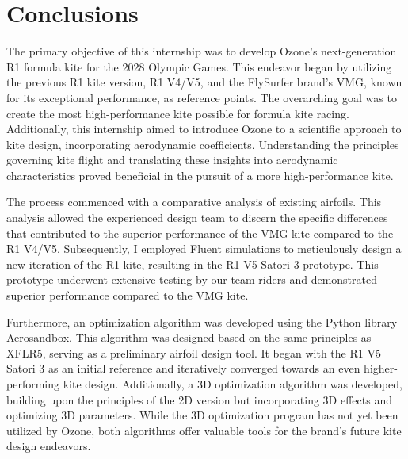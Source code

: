 
\chapter{Conclusions} 	%
\label{Conclusion} 		%



The primary objective of this internship was to develop Ozone's next-generation R1 formula kite for the 2028 Olympic Games. This endeavor began by utilizing the previous R1 kite version, R1 V4/V5, and the FlySurfer brand's VMG, known for its exceptional performance, as reference points. The overarching goal was to create the most high-performance kite possible for formula kite racing. 
Additionally, this internship aimed to introduce Ozone to a scientific approach to kite design, incorporating aerodynamic coefficients. Understanding the principles governing kite flight and translating these insights into aerodynamic characteristics proved beneficial in the pursuit of a more high-performance kite.

The process commenced with a comparative analysis of existing airfoils. This analysis allowed the experienced design team to discern the specific differences that contributed to the superior performance of the VMG kite compared to the R1 V4/V5. Subsequently, I employed Fluent simulations to meticulously design a new iteration of the R1 kite, resulting in the R1 V5 Satori 3 prototype. This prototype underwent extensive testing by our team riders and demonstrated superior performance compared to the VMG kite.

Furthermore, an optimization algorithm was developed using the Python library Aerosandbox. This algorithm was designed based on the same principles as XFLR5, serving as a preliminary airfoil design tool. It began with the R1 V5 Satori 3 as an initial reference and iteratively converged towards an even higher-performing kite design. Additionally, a 3D optimization algorithm was developed, building upon the principles of the 2D version but incorporating 3D effects and optimizing 3D parameters. While the 3D optimization program has not yet been utilized by Ozone, both algorithms offer valuable tools for the brand's future kite design endeavors.

